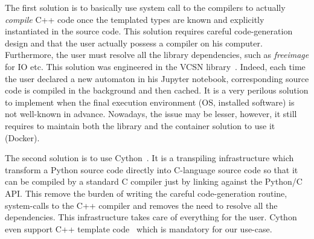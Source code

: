 The first solution is to basically use system call to the compilers to actually \emph{compile} C++ code once the
templated types are known and explicitly instantiated in the source code. This solution requires careful code-generation
design and that the user actually possess a compiler on his computer. Furthermore, the user must resolve all the
library dependencies, such as \emph{freeimage} for IO etc. This solution was engineered in the VCSN
library~\parencite{demaille.2013.vcsn}. Indeed, each time the user declared a new automaton in his Jupyter notebook,
corresponding source code is compiled in the background and then cached. It is a very perilous solution to implement
when the final execution environment (OS, installed software) is not well-known in advance. Nowadays, the issue may be
lesser, however, it still requires to maintain both the library and the container solution to use it (Docker).

The second solution is to use Cython~\parencite{behnel.2010.cython}. It is a transpiling infrastructure which transform
a Python source code directly into C-language source code so that it can be compiled by a standard C compiler just by
linking against the Python/C API. This remove the burden of writing the careful code-generation routine, system-calls to
the C++ compiler and removes the need to resolve all the dependencies. This infrastructure takes care of everything for
the user. Cython even support C++ template code~\parencite{behnel.2022.cython-template} which is mandatory for our
use-case.

